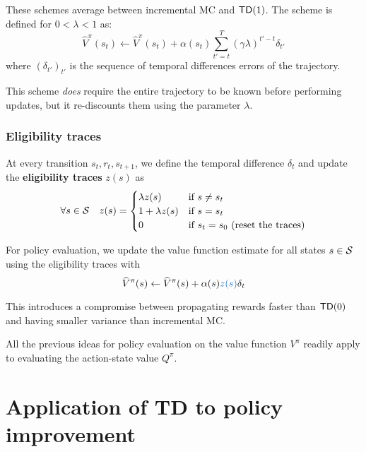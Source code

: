 \documentclass[../course-notes.tex]{subfiles}
\begin{document}
These schemes average between incremental MC and $\mathsf{TD}(1)$. The scheme is defined for $0 < \lambda < 1$ as:
\begin{equation}
	\widehat{V}^\pi(s_t) \leftarrow \widehat{V}^\pi(s_t) + \alpha(s_t) \sum_{t'=t}^T (\gamma\lambda)^{t'-t}\delta_{t'}
\end{equation}
where ${(\delta_{t'})}_{t'}$ is the sequence of temporal differences errors of the trajectory.


This scheme \textit{does} require the entire trajectory to be known before performing updates, but it re-discounts them using the parameter $\lambda$.


\subsubsection{Eligibility traces}

At every transition $s_t,r_t,s_{t+1}$, we define the temporal difference $\delta_t$ and update the \textbf{\bluefont eligibility traces} {\bluefont $z(s)$} as
\[
	\forall s\in\mathcal{S} \quad 
	z(s) = \begin{cases}
	\lambda z(s) &\text{if }s\neq s_t \\
	1 + \lambda z(s)& \text{if }s=s_t \\
	0& \text{if } s_t = s_0 \text{ (reset the traces)}
	\end{cases}
\]

For policy evaluation, we update the value function estimate for all states $s\in\mathcal{S}$ using the eligibility traces with
\begin{equation}
	\widehat{V}^\pi(s) \leftarrow
	\widehat{V}^\pi(s) + \alpha(s){\bluefont z(s)}\delta_t
\end{equation}



This introduces a compromise between propagating rewards faster than $\mathsf{TD}(0)$ and having smaller variance than incremental MC.


\begin{remark}
	All the previous ideas for policy evaluation on the value function $V^\pi$ readily apply to evaluating the action-state value $Q^\pi$.
\end{remark}



\section{Application of TD to policy improvement}
\end{document}
